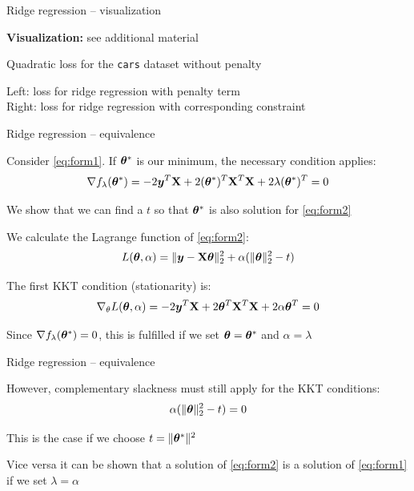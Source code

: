 \documentclass[11pt,compress,t,notes=noshow, xcolor=table]{beamer}
\begin{document}
\begin{framei}[fs=small]{Ridge regression -- visualization}
\item \textbf{Visualization:} see additional material
\vfill
{}
\item Quadratic loss for the \texttt{cars} dataset without penalty
\vfill
{}
\item Left: loss for ridge regression with penalty term\\
Right: loss for ridge regression with corresponding constraint
\end{framei}


\begin{framei}[fs=small]{Ridge regression -- equivalence}
\item Consider \eqref{eq:form1}. If $\bm{\theta}^*$ is our minimum, the necessary condition applies:
$$
\nabla f_\lambda(\bm{\theta}^*) = - 2 \bm{y}^T\mathbf{X} + 2 (\bm{\theta}^*)^T \mathbf{X}^T\mathbf{X} + 2 \lambda (\bm{\theta}^*)^T = 0
$$
\item We show that we can find a $t$ so that $\bm{\theta}^*$ is also solution for \eqref{eq:form2}
\item We calculate the Lagrange function of \eqref{eq:form2}:
$$
L(\bm{\theta}, \alpha) = \|\bm{y} - \mathbf{X}\bm{\theta}\|_2^2 + \alpha (\|\bm{\theta}\|^2_2 - t)
$$
\item The first KKT condition (stationarity) is:
$$
\nabla_\theta L(\bm{\theta}, \alpha)= - 2\bm{y}^T\mathbf{X} + 2 \bm{\theta}^T \mathbf{X}^T\mathbf{X} + 2 \alpha \bm{\theta}^T = 0
$$
\item Since $\nabla f_\lambda(\bm{\theta}^*) = 0$, this is fulfilled if we set $\bm{\theta} = \bm{\theta}^*$ and $\alpha = \lambda$
\end{framei}


\begin{framei}{Ridge regression -- equivalence}
\item However, complementary slackness must still apply for the KKT conditions:
$$
\alpha(\|\bm{\theta}\|^2_2 - t) = 0
$$
\item This is the case if we choose $t = \|\bm{\theta}^*\|^2$
\vfill
\item Vice versa it can be shown that a solution of \eqref{eq:form2} is a solution of \eqref{eq:form1} if we set $\lambda = \alpha$
\end{framei}

\endlecture
\end{document}

